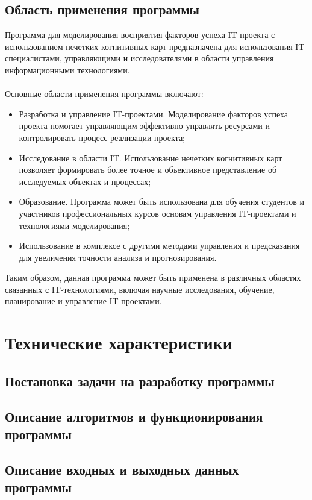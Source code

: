 \documentclass{article}
\begin{document}
    \subsection {Область применения программы}
    Программа для моделирования восприятия факторов успеха IT-проекта с использованием нечетких когнитивных карт предназначена для использования IT-специалистами, управляющими и исследователями в области управления информационными технологиями.\\
    ~\\
    Основные области применения программы включают:
    \begin{itemize}
        \item Разработка и управление IT-проектами. Моделирование факторов успеха проекта помогает управляющим эффективно управлять ресурсами и контролировать процесс реализации проекта;
        \item Исследование в области IT. Использование нечетких когнитивных карт позволяет формировать более точное и объективное представление об исследуемых объектах и процессах;
        \item Образование. Программа может быть использована для обучения студентов и участников профессиональных курсов основам управления IT-проектами и технологиями моделирования;
        \item Использование в комплексе с другими методами управления и предсказания для увеличения точности анализа и прогнозирования.
    \end{itemize}
    Таким образом, данная программа может быть применена в различных областях связанных с IT-технологиями, включая научные исследования, обучение, планирование и управление IT-проектами.
    \newpage
    \section {Технические характеристики}
    \subsection {Постановка задачи на разработку программы}
    \subsection {Описание алгоритмов и функционирования программы}
    \subsection {Описание входных и выходных данных программы}
\end{document}
